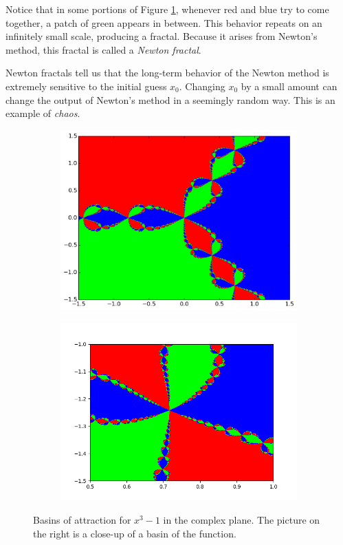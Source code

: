 Notice that in some portions of Figure \ref{fig:fractal_hw}, whenever red and blue try to come together, a patch of green appears in between.
This behavior repeats on an infinitely small scale, producing a fractal.
Because it arises from Newton's method, this fractal is called a \emph{Newton fractal}.

Newton fractals tell us that the long-term behavior of the Newton method is extremely sensitive to the initial guess $x_0$.
Changing $x_0$ by a small amount can change the output of Newton's method in a seemingly random way.
This is an example of \emph{chaos}.

\begin{figure}[H]
\begin{center}
\begin{subfigure}[b]{.49\textwidth}
\centering
\includegraphics[width=\textwidth]{figures/fractal_hw.png}
\end{subfigure}
\begin{subfigure}[b]{.49\textwidth}
\centering
\includegraphics[width=\textwidth]{figures/fractal_hw_zoom.png}
\end{subfigure}
\caption{ Basins of attraction for $x^3-1$ in the complex plane.
The picture on the right is a close-up of a basin of the function.}
\label{fig:fractal_hw}
\end{center}
\end{figure}

